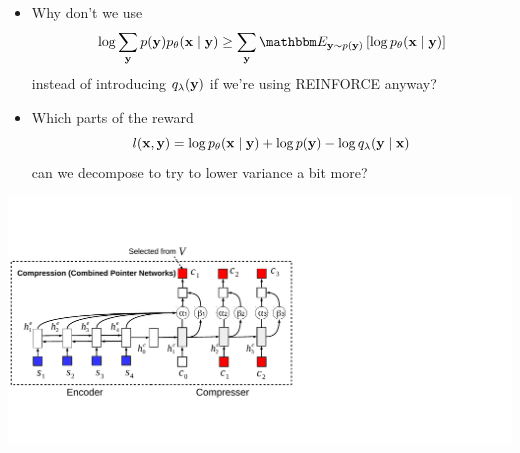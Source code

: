 \begin{frame}
\begin{center}
\end{center}
\begin{itemize}
\item Why don't we use
$$\log\sum_\by p(\by)p_\theta(\bx\mid\by) \geq \sum_\by \E{\by\sim p(\by)}{\log p_\theta(\bx\mid\by)}$$
instead of introducing $q_\lambda(\mathbf{y})$ if we're using REINFORCE anyway?
\item Which parts of the reward
$$l(\mathbf{x}, \mathbf{y}) = \log p_\theta(\mathbf{x}\mid\mathbf{y}) + \log p(\mathbf{y}) - \log q_\lambda(\mathbf{y}\mid\mathbf{x})$$
can we decompose to try to lower variance a bit more?
\end{itemize}
\end{frame}

\begin{frame}
\begin{center}
\end{center}    
\center
\includegraphics[scale=0.65]{img/fsc.pdf}
\end{frame}

